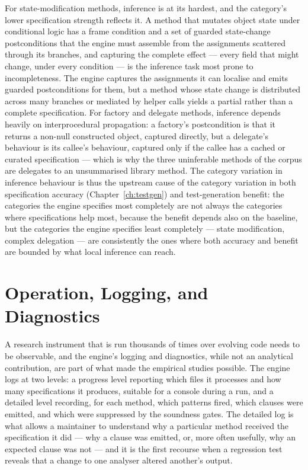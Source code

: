 For state-modification methods, inference is at its hardest, and the category's
lower specification strength reflects it. A method that mutates object state under
conditional logic has a frame condition and a set of guarded state-change
postconditions that the engine must assemble from the assignments scattered through
its branches, and capturing the complete effect --- every field that might change,
under every condition --- is the inference task most prone to incompleteness. The
engine captures the assignments it can localise and emits guarded postconditions
for them, but a method whose state change is distributed across many branches or
mediated by helper calls yields a partial rather than a complete specification. For
factory and delegate methods, inference depends heavily on interprocedural
propagation: a factory's postcondition is that it returns a non-null constructed
object, captured directly, but a delegate's behaviour is its callee's behaviour,
captured only if the callee has a cached or curated specification --- which is why
the three uninferable methods of the corpus are delegates to an unsummarised
library method. The category variation in inference behaviour is thus the upstream
cause of the category variation in both specification accuracy
(Chapter~\ref{ch:testgen}) and test-generation benefit: the categories the engine
specifies most completely are not always the categories where specifications help
most, because the benefit depends also on the baseline, but the categories the
engine specifies least completely --- state modification, complex delegation --- are
consistently the ones where both accuracy and benefit are bounded by what local
inference can reach.

\section{Operation, Logging, and Diagnostics}
\label{sec:inf-operation}

A research instrument that is run thousands of times over evolving code needs to be
observable, and the engine's logging and diagnostics, while not an analytical
contribution, are part of what made the empirical studies possible. The engine logs
at two levels: a progress level reporting which files it processes and how many
specifications it produces, suitable for a console during a run, and a detailed
level recording, for each method, which patterns fired, which clauses were emitted,
and which were suppressed by the soundness gates. The detailed log is what allows a
maintainer to understand why a particular method received the specification it did
--- why a clause was emitted, or, more often usefully, why an expected clause was
not --- and it is the first recourse when a regression test reveals that a change to
one analyser altered another's output.

